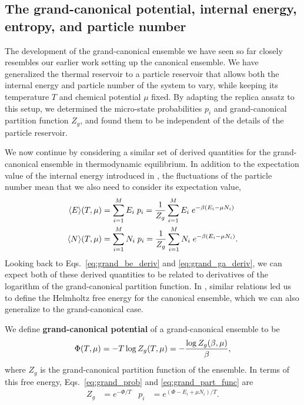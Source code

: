 \subsection{\label{sec:grand_pot}The grand-canonical potential, internal energy, entropy, and particle number}
The development of the grand-canonical ensemble we have seen so far closely resembles our earlier work setting up the canonical ensemble.
We have generalized the thermal reservoir to a particle reservoir that allows both the internal energy and particle number of the system \Om to vary, while keeping its temperature $T$ and chemical potential $\mu$ fixed.
By adapting the replica ansatz to this setup, we determined the micro-state probabilities $p_i$ and grand-canonical partition function $Z_g$, and found them to be independent of the details of the particle reservoir.

We now continue by considering a similar set of derived quantities for the grand-canonical ensemble in thermodynamic equilibrium.
In addition to the expectation value of the internal energy introduced in , the fluctuations of the particle number mean that we also need to consider its expectation value,
\begin{align*}
  \left\langle E \right\rangle\!(T, \mu) & = \sum_{i = 1}^M E_i \; p_i = \frac{1}{Z_g} \sum_{i = 1}^M E_i \; e^{-\beta (E_i - \mu N_i)} \\
  \left\langle N \right\rangle\!(T, \mu) & = \sum_{i = 1}^M N_i \; p_i = \frac{1}{Z_g} \sum_{i = 1}^M N_i \; e^{-\beta (E_i - \mu N_i)}.
\end{align*}
Looking back to Eqs.~\ref{eq:grand_be_deriv} and \ref{eq:grand_ga_deriv}, we can expect both of these derived quantities to be related to derivatives of the logarithm of the grand-canonical partition function.
In , similar relations led us to define the Helmholtz free energy for the canonical ensemble, which we can also generalize to the grand-canonical case.

\begin{shaded}
  We define \textbf{grand-canonical potential} of a grand-canonical ensemble to be
  \begin{equation}
    \label{eq:grand_pot}
    \Phi(T, \mu) = -T \log Z_g(T, \mu) = -\frac{\log Z_g(\beta, \mu)}{\beta},
  \end{equation}
  where $Z_g$ is the grand-canonical partition function of the ensemble.
  In terms of this free energy, Eqs.~\ref{eq:grand_prob} and \ref{eq:grand_part_func} are
  \begin{align*}
    Z_g & = e^{-\Phi / T} &
    p_i & = e^{(\Phi - E_i + \mu N_i) / T}.
  \end{align*}
\end{shaded}

